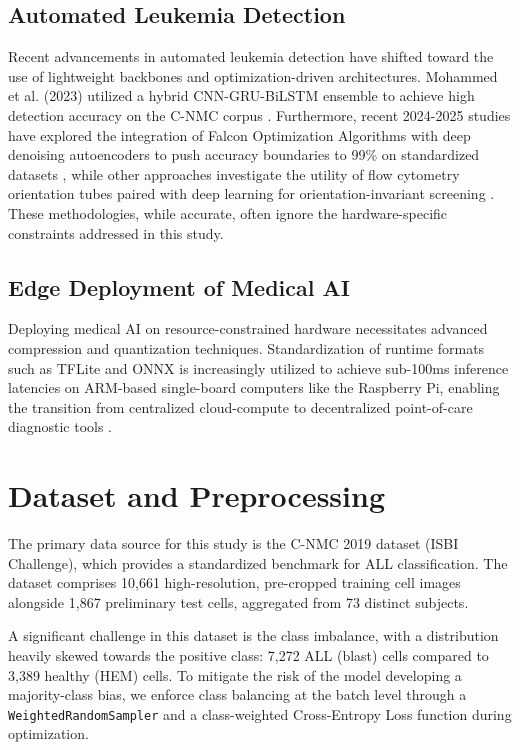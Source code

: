 \documentclass[journal]{IEEEtran}
\begin{document}
    \subsection{Automated Leukemia Detection}
    Recent advancements in automated leukemia detection have shifted toward the use of lightweight backbones and optimization-driven architectures. Mohammed et al. (2023) utilized a hybrid CNN-GRU-BiLSTM ensemble to achieve high detection accuracy on the C-NMC corpus \cite{b7}. Furthermore, recent 2024-2025 studies have explored the integration of Falcon Optimization Algorithms with deep denoising autoencoders to push accuracy boundaries to 99\% on standardized datasets \cite{b10}, while other approaches investigate the utility of flow cytometry orientation tubes paired with deep learning for orientation-invariant screening \cite{b9}. These methodologies, while accurate, often ignore the hardware-specific constraints addressed in this study.

    \subsection{Edge Deployment of Medical AI}
    Deploying medical AI on resource-constrained hardware necessitates advanced compression and quantization techniques. Standardization of runtime formats such as TFLite and ONNX is increasingly utilized to achieve sub-100ms inference latencies on ARM-based single-board computers like the Raspberry Pi, enabling the transition from centralized cloud-compute to decentralized point-of-care diagnostic tools \cite{b12}.


    \section{Dataset and Preprocessing}
    The primary data source for this study is the C-NMC 2019 dataset (ISBI Challenge), which provides a standardized benchmark for ALL classification. The dataset comprises 10,661 high-resolution, pre-cropped training cell images alongside 1,867 preliminary test cells, aggregated from 73 distinct subjects.

    A significant challenge in this dataset is the class imbalance, with a distribution heavily skewed towards the positive class: 7,272 ALL (blast) cells compared to 3,389 healthy (HEM) cells. To mitigate the risk of the model developing a majority-class bias, we enforce class balancing at the batch level through a \texttt{WeightedRandomSampler} and a class-weighted Cross-Entropy Loss function during optimization.
\end{document}
